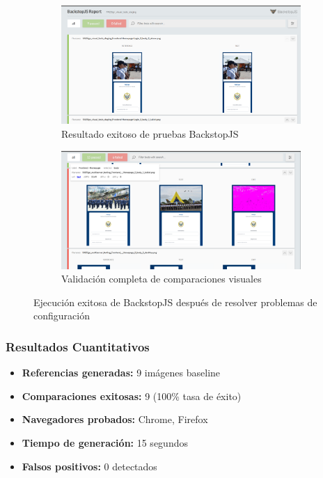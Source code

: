 \documentclass{article}
\begin{document}
\begin{figure}[H]
\begin{subfigure}{0.48\textwidth}
\centering
\includegraphics[width=\textwidth]{BackStop/test_BackStop.png}
\caption{Resultado exitoso de pruebas BackstopJS}
\label{fig:backstop-success-1}
\end{subfigure}
\hfill
\begin{subfigure}{0.48\textwidth}
\centering
\includegraphics[width=\textwidth]{BackStop/test_BackStop2.png}
\caption{Validación completa de comparaciones visuales}
\label{fig:backstop-success-2}
\end{subfigure}
\caption{Ejecución exitosa de BackstopJS después de resolver problemas de configuración}
\label{fig:backstop-success}
\end{figure}

\subsubsection{Resultados Cuantitativos}
\begin{itemize}[nosep]
\item \textbf{Referencias generadas:} 9 imágenes baseline
\item \textbf{Comparaciones exitosas:} 9 (100\% tasa de éxito)
\item \textbf{Navegadores probados:} Chrome, Firefox
\item \textbf{Tiempo de generación:} 15 segundos
\item \textbf{Falsos positivos:} 0 detectados
\end{itemize}
\end{document}
